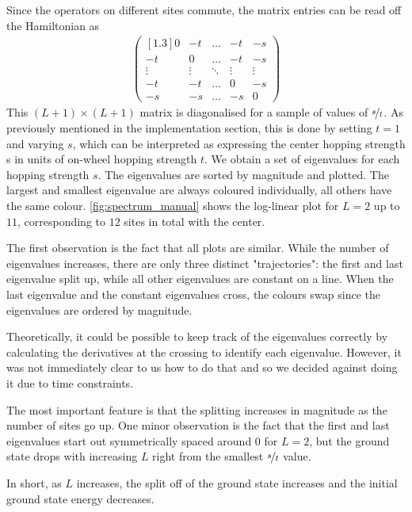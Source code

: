     Since the operators on different sites commute, the matrix entries can be read off the Hamiltonian as 
    \begin{align}
        \begin{pmatrix}[1.3]
            0 & -t & \hdots & -t & -s \\
            -t & 0 & \hdots & -t & -s \\
            \vdots & \vdots & \ddots & \vdots & \vdots \\
            -t & -t & \hdots & 0 & -s \\
            -s & -s & \hdots & -s & 0
        \end{pmatrix}
    \end{align}
    This $(L+1) \times (L+1)$ matrix is diagonalised for a sample of values of $\nicefrac{s}{t}$. As previously mentioned in the implementation section, this is done by setting $t=1$ and varying $s$, which can be interpreted as expressing the center hopping strength s in units of on-wheel hopping strength $t$. We obtain a set of eigenvalues for each hopping strength $s$. The eigenvalues are sorted by magnitude and plotted. The largest and smallest eigenvalue are always coloured individually, all others have the same colour. \autoref{fig:spectrum_manual} shows the log-linear plot for $L = 2$ up to $11$, corresponding to $12$ sites in total with the center.

    The first observation is the fact that all plots are similar. While the number of eigenvalues increases, there are only three distinct "trajectories": the first and last eigenvalue split up, while all other eigenvalues are constant on a line. When the last eigenvalue and the constant eigenvalues cross, the colours swap since the eigenvalues are ordered by magnitude. 
    
    Theoretically, it could be possible to keep track of the eigenvalues correctly by calculating the derivatives at the crossing to identify each eigenvalue. However, it was not immediately clear to us how to do that and so we decided against doing it due to time constraints. 
    
    The most important feature is that the splitting increases in magnitude as the number of sites go up. One minor observation is the fact that the first and last eigenvalues start out symmetrically spaced around 0 for $L=2$, but the ground state drops with increasing $L$ right from the smallest $\nicefrac{s}{t}$ value. 
    
    In short, as $L$ increases, the split off of the ground state increases and the initial ground state energy decreases.

